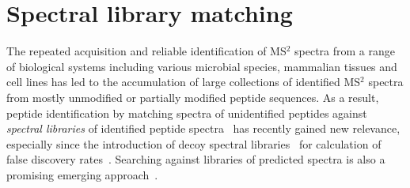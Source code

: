 \documentclass[8.5pt,twoside,twocolumn]{article}
\begin{document}
\section{Spectral library matching}

The repeated acquisition and reliable identification of MS$^2$ spectra from a range of biological systems including various microbial species, mammalian tissues and cell lines has led to the accumulation of large collections of identified MS$^2$ spectra from mostly unmodified or partially modified peptide sequences. As a result, peptide identification by matching spectra of unidentified peptides against {\em spectral libraries} of identified peptide spectra~\cite{lam07} has recently gained new relevance, especially since the introduction of decoy spectral libraries~\cite{lam10} for calculation of false discovery rates~\cite{elias07,nesvizhskii10}. Searching against libraries of predicted spectra is also a promising emerging approach~\cite{yen09,yen11}.
\end{document}
